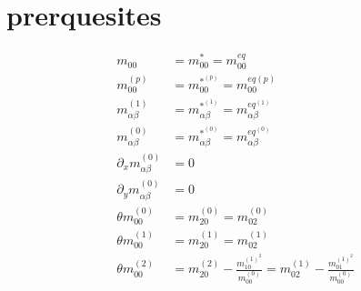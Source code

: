 \documentclass{article}
\begin{document}
  \section{prerquesites}
  \begin{align}
    m_{00} &= m_{00}^* = m_{00}^{eq}  \tag{P1}\\
    m_{00}^{(p)} &= m_{00}^{*^{(p)}} = m_{00}^{eq(p)} \tag{P2} \\
    m_{\alpha\beta}^{(1)} &= m_{\alpha\beta}^{*^{(1)}} = m_{\alpha\beta}^{eq^{(1)}} \tag{P3} \\
    m_{\alpha\beta}^{(0)} &= m_{\alpha\beta}^{*^{(0)}} = m_{\alpha\beta}^{eq^{(0)}} \tag{P4} \\
    \partial_x m_{\alpha\beta}^{(0)} &= 0  \tag{P5} \\
    \partial_y m_{\alpha\beta}^{(0)} &= 0  \tag{P6} \\
    \theta m_{00}^{(0)} &= m_{20}^{(0)} = m_{02}^{(0)} \tag{P7} \\
    \theta m_{00}^{(1)} &= m_{20}^{(1)} = m_{02}^{(1)} \tag{P8}\\
    \theta m_{00}^{(2)} &= m_{20}^{(2)} - \frac{m_{10}^{{(1)}^2}}{m_{00}^{(0)}}  = m_{02}^{(1)} - \frac{m_{01}^{{(1)}^2}}{m_{00}^{(0)}} \tag{P9}
  \end{align}
\end{document}
